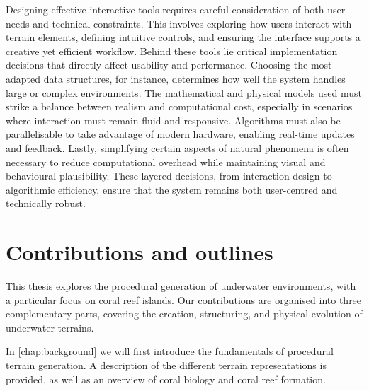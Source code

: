 Designing effective interactive tools requires careful consideration of both user needs and technical constraints. This involves exploring how users interact with terrain elements, defining intuitive controls, and ensuring the interface supports a creative yet efficient workflow. Behind these tools lie critical implementation decisions that directly affect usability and performance. Choosing the most adapted data structures, for instance, determines how well the system handles large or complex environments. The mathematical and physical models used must strike a balance between realism and computational cost, especially in scenarios where interaction must remain fluid and responsive. Algorithms must also be parallelisable to take advantage of modern hardware, enabling real-time updates and feedback. Lastly, simplifying certain aspects of natural phenomena is often necessary to reduce computational overhead while maintaining visual and behavioural plausibility. These layered decisions, from interaction design to algorithmic efficiency, ensure that the system remains both user-centred and technically robust.




\section{Contributions and outlines}
This thesis explores the procedural generation of underwater environments, with a particular focus on coral reef islands. Our contributions are organised into three complementary parts, covering the creation, structuring, and physical evolution of underwater terrains.

In \cref{chap:background} we will first introduce the fundamentals of procedural terrain generation. A description of the different terrain representations is provided, as well as an overview of coral biology and coral reef formation.


